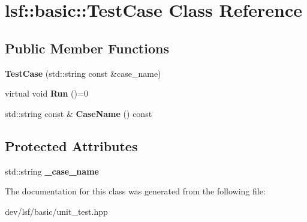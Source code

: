\hypertarget{classlsf_1_1basic_1_1TestCase}{
\section{lsf::basic::TestCase Class Reference}
\label{classlsf_1_1basic_1_1TestCase}
}
\subsection*{Public Member Functions}
\begin{DoxyCompactItemize}
\item 
\hypertarget{classlsf_1_1basic_1_1TestCase_a63f9147d479c22c3e9d2b2152f8eecc4}{
{\bfseries TestCase} (std::string const \&case\_\-name)}
\label{classlsf_1_1basic_1_1TestCase_a63f9147d479c22c3e9d2b2152f8eecc4}

\item 
\hypertarget{classlsf_1_1basic_1_1TestCase_a785320423f39a9105f96e9a85dcc0e14}{
virtual void {\bfseries Run} ()=0}
\label{classlsf_1_1basic_1_1TestCase_a785320423f39a9105f96e9a85dcc0e14}

\item 
\hypertarget{classlsf_1_1basic_1_1TestCase_a42322f625cd0c83dfc0f59e14f05d132}{
std::string const \& {\bfseries CaseName} () const }
\label{classlsf_1_1basic_1_1TestCase_a42322f625cd0c83dfc0f59e14f05d132}

\end{DoxyCompactItemize}
\subsection*{Protected Attributes}
\begin{DoxyCompactItemize}
\item 
\hypertarget{classlsf_1_1basic_1_1TestCase_a8300043304018e5c838b12a1c1f87c4c}{
std::string {\bfseries \_\-case\_\-name}}
\label{classlsf_1_1basic_1_1TestCase_a8300043304018e5c838b12a1c1f87c4c}

\end{DoxyCompactItemize}


The documentation for this class was generated from the following file:\begin{DoxyCompactItemize}
\item 
dev/lsf/basic/unit\_\-test.hpp\end{DoxyCompactItemize}
